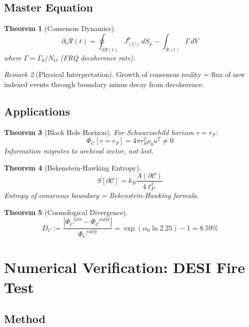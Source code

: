 \documentclass[12pt,a4paper]{article}
\numberwithin{equation}{section}
\theoremstyle{plain}
\newtheorem{theorem}{Theorem}[section]
\theoremstyle{definition}
\theoremstyle{remark}
\newtheorem{remark}[theorem]{Remark}
\newcommand{\Reality}{\ensuremath{\mathcal{R}}}
\newcommand{\Chain}{\ensuremath{\mathcal{C}}}
\newcommand{\alphazero}{\ensuremath{\alpha_0}}
\newcommand{\PhiC}{\ensuremath{\Phi_C}}
\newcommand{\JC}{\ensuremath{J^{\mu}_{(C)}}}
\newcommand{\DC}{\ensuremath{D_C}}
\begin{document}
\subsection{Master Equation}

\begin{theorem}[Consensus Dynamics]
\label{thm:master}
\[
\boxed{
\partial_t \Reality(t) = \oint_{\partial\Reality(t)} \JC\, dS_{\mu} - \int_{\Reality(t)} \Gamma\, dV
}
\]
where $\Gamma = \Gamma_0/N_O$ (FRQ decoherence rate).
\end{theorem}

\begin{remark}[Physical Interpretation]
Growth of consensus reality = flux of new indexed events through boundary minus decay from decoherence.
\end{remark}

\subsection{Applications}

\begin{theorem}[Black Hole Horizon]
For Schwarzschild horizon $r = r_S$:
\[
\PhiC[r = r_S] = 4\pi r_S^2 \rho_0 u^T \neq 0
\]
Information migrates to archival sector, not lost.
\end{theorem}

\begin{theorem}[Bekenstein-Hawking Entropy]
\label{thm:BH-entropy}
\[
\boxed{S[\partial\Chain] = k_B \frac{A(\partial\Chain)}{4\ell_P^2}}
\]
Entropy of consensus boundary = Bekenstein-Hawking formula.
\end{theorem}

\begin{theorem}[Cosmological Divergence]
\label{thm:divergence}
\[
\boxed{\DC := \frac{|\PhiC^{\mathrm{late}} - \PhiC^{\mathrm{early}}|}{\PhiC^{\mathrm{early}}} = \exp(\alphazero \ln 2.25) - 1 = 8.59\%}
\]
\end{theorem}

\section{Numerical Verification: DESI Fire Test}
\label{sec:desi-fire}

\subsection{Method}
\end{document}
